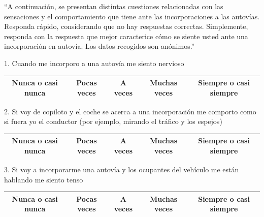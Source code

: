 ``A continuación, se presentan distintas cuestiones relacionadas con las sensaciones y el comportamiento que tiene ante las incorporaciones a las autovías. Responda rápido, considerando que no hay respuestas correctas. Simplemente, responda con la respuesta que mejor caracterice cómo se siente usted ante una incorporación en autovía. Los datos recogidos son anónimos.''



1. Cuando me incorporo a una autovía me siento nervioso
\vspace{-10pt}
\begin{table}[htbp]
\centering
\begin{tabular}{|c|c|c|c|c|}
\hline
Nunca o casi nunca & Pocas veces & A veces & Muchas veces & Siempre o casi siempre \\ \hline
\end{tabular}
\end{table}


2. Si voy de copiloto y el coche se acerca a una incorporación me comporto como si fuera yo el conductor (por ejemplo, mirando el tráfico y los espejos) 
\vspace{-10pt}
\begin{table}[h]
\centering
\begin{tabular}{|c|c|c|c|c|}
\hline
Nunca o casi nunca & Pocas veces & A veces & Muchas veces & Siempre o casi siempre \\ \hline
\end{tabular}
\end{table}


3. Si voy a incorporarme una autovía y los ocupantes del vehículo me están hablando me siento tenso
\vspace{-10pt}
\begin{table}[h]
\centering
\begin{tabular}{|c|c|c|c|c|}
\hline
Nunca o casi nunca & Pocas veces & A veces & Muchas veces & Siempre o casi siempre \\ \hline
\end{tabular}
\end{table}

